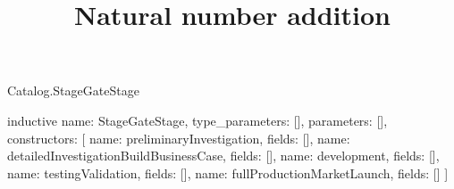\begin{lexlean}{Catalog.StageGateStage}
\title{Natural number addition}
\begin{semanticmodule}
inductive{
  name: StageGateStage,
  type_parameters: [],
  parameters: [],
  constructors: [
    {name: preliminaryInvestigation, fields: []},
    {name: detailedInvestigationBuildBusinessCase, fields: []},
    {name: development, fields: []},
    {name: testingValidation, fields: []},
    {name: fullProductionMarketLaunch, fields: []}
  ]
}
\end{semanticmodule}
\end{lexlean}
